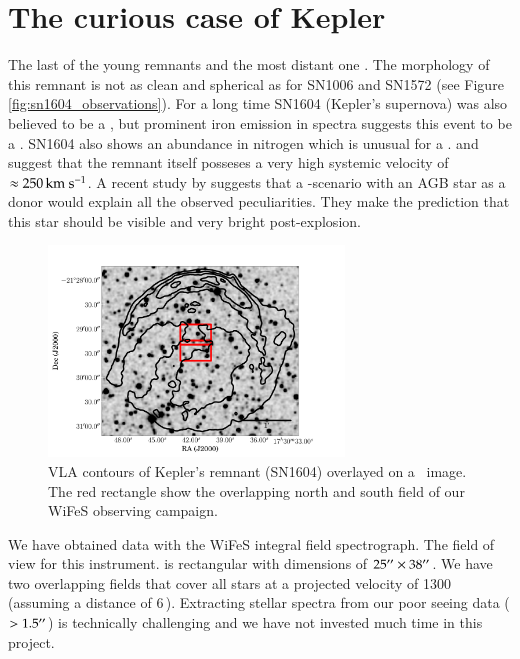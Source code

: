 \section{The curious case of Kepler}

The last of the young remnants and the most distant one \citep[][estimates a distance of $\ge 6$\,\kpc]{2008ApJ...689..231V}.  The morphology of this remnant is not as clean and spherical as for SN1006 and SN1572 (see Figure \ref{fig:sn1604_observations}). For a long time SN1604 (Kepler's supernova) was also believed to be a \snib, but prominent iron emission in \xray spectra \citep{2007ApJ...668L.135R} suggests this event to be a \snia \citep{1995ApJ...444L..81H}. SN1604 also shows an abundance in nitrogen which is unusual for a \snia. \citet{1991ApJ...366..484B} and \citet{2003A&A...407..249S} suggest that the remnant itself posseses a very high systemic velocity of  $\approx 250\,\hbox{km s$^{-1}$}$. A recent study by \citet{2011arXiv1103.5487C} suggests that a \sd-scenario with an AGB star as a donor would explain all the observed peculiarities. They make the prediction that this star should be visible and very bright post-explosion. 

\begin{figure}[htbp] %
   \centering
   \includegraphics[width=0.7\textwidth]{chapter_conclusion/plots/sn1604_overlay.pdf} 
   \caption{VLA contours of Kepler's remnant (SN1604) overlayed on a \twomass\ image. The red rectangle show the overlapping north and south field of our WiFeS observing campaign.}
   \label{fig:example}
\end{figure}

We have obtained data with the WiFeS integral field spectrograph. The field of view for this instrument. is rectangular with dimensions of $25\hbox{$^{\prime\prime}$} \times 38\hbox{$^{\prime\prime}$}$. We have two overlapping fields that cover all stars at a projected velocity of 1300\,\kms (assuming a distance of 6\,\kpc). Extracting stellar spectra from our poor seeing data ($> 1.5\hbox{$^{\prime\prime}$}$) is technically challenging and we have not invested much time in this project.

